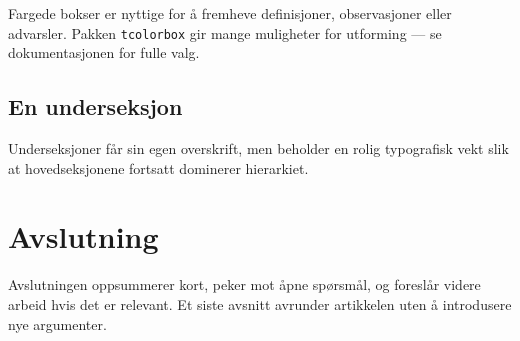 \documentclass[12pt]{article}
\begin{document}
\begin{tcolorbox}[colback=Beige, colframe=DarkSlateGray, title=Merknad]
  Fargede bokser er nyttige for å fremheve definisjoner, observasjoner
  eller advarsler. Pakken \texttt{tcolorbox} gir mange muligheter for
  utforming --- se dokumentasjonen for fulle valg.
\end{tcolorbox}

\subsection{En underseksjon}

Underseksjoner får sin egen overskrift, men beholder en rolig
typografisk vekt slik at hovedseksjonene fortsatt dominerer
hierarkiet.


\section{Avslutning}

Avslutningen oppsummerer kort, peker mot åpne spørsmål, og foreslår
videre arbeid hvis det er relevant. Et siste avsnitt avrunder
artikkelen uten å introdusere nye argumenter.




\end{document}
